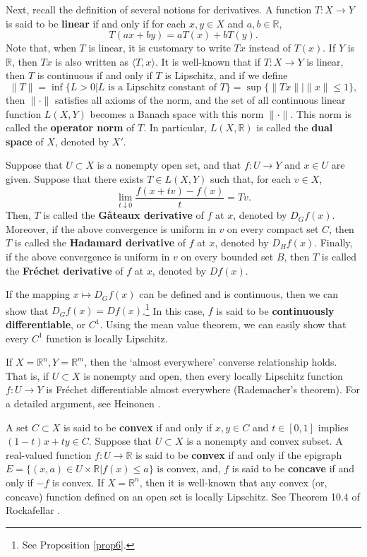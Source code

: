 \documentclass[a4paper,12pt]{article}
\theoremstyle{definition}
\begin{document}
Next, recall the definition of several notions for derivatives. A function $T:X\to Y$ is said to be {\bf linear} if and only if for each $x,y\in X$ and $a,b\in \mathbb{R}$,
\[T(ax+by)=aT(x)+bT(y).\]
Note that, when $T$ is linear, it is customary to write $Tx$ instead of $T(x)$. If $Y$ is $\mathbb{R}$, then $Tx$ is also written as $\langle T,x\rangle$. It is well-known that if $T:X\to Y$ is linear, then $T$ is continuous if and only if $T$ is Lipschitz, and if we define
\[\|T\|=\inf\{L>0|L\mbox{ is a Lipschitz constant of }T\}=\sup\{\|Tx\||\|x\|\le 1\},\]
then $\|\cdot\|$ satisfies all axioms of the norm, and the set of all continuous linear function $L(X,Y)$ becomes a Banach space with this norm $\|\cdot\|$. This norm is called the {\bf operator norm} of $T$. In particular, $L(X,\mathbb{R})$ is called the {\bf dual space} of $X$, denoted by $X'$.

Suppose that $U\subset X$ is a nonempty open set, and that $f:U\to Y$ and $x\in U$ are given. Suppose that there exists $T\in L(X,Y)$ such that, for each $v\in X$,
\[\lim_{t\downarrow 0}\frac{f(x+tv)-f(x)}{t}=Tv.\]
Then, $T$ is called the {\bf G\^ateaux derivative} of $f$ at $x$, denoted by $D_Gf(x)$. Moreover, if the above convergence is uniform in $v$ on every compact set $C$, then $T$ is called the {\bf Hadamard derivative} of $f$ at $x$, denoted by $D_Hf(x)$. Finally, if the above convergence is uniform in $v$ on every bounded set $B$, then $T$ is called the {\bf Fr\'echet derivative} of $f$ at $x$, denoted by $Df(x)$.

If the mapping $x\mapsto D_Gf(x)$ can be defined and is continuous, then we can show that $D_Gf(x)=Df(x)$.\footnote{See Proposition \ref{prop6}.} In this case, $f$ is said to be {\bf continuously differentiable}, or $C^1$. Using the mean value theorem, we can easily show that every $C^1$ function is locally Lipschitz.

If $X=\mathbb{R}^n, Y=\mathbb{R}^m$, then the `almost everywhere' converse relationship holds. That is, if $U\subset X$ is nonempty and open, then every locally Lipschitz function $f:U\to Y$ is Fr\'echet differentiable almost everywhere (Rademacher's theorem). For a detailed argument, see Heinonen \cite{H}.

A set $C\subset X$ is said to be {\bf convex} if and only if $x,y\in C$ and $t\in [0,1]$ implies $(1-t)x+ty\in C$. Suppose that $U\subset X$ is a nonempty and convex subset. A real-valued function $f:U\to \mathbb{R}$ is said to be {\bf convex} if and only if the epigraph $E=\{(x,a)\in U\times \mathbb{R}|f(x)\le a\}$ is convex, and, $f$ is said to be {\bf concave} if and only if $-f$ is convex. If $X=\mathbb{R}^n$, then it is well-known that any convex (or, concave) function defined on an open set is locally Lipschitz. See Theorem 10.4 of Rockafellar \cite{R}.
\end{document}
